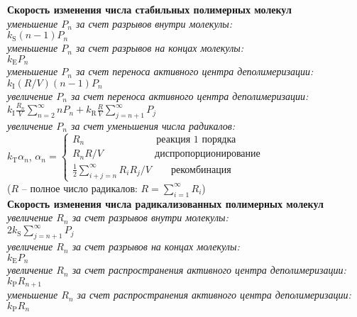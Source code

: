 \newpage
\begin{center}
	\textbf{Скорость изменения числа стабильных полимерных молекул} \\
	\textit{уменьшение $P_n$ за счет разрывов внутри молекулы:} \\
	$k_\mathrm{S} (n-1) P_n$ \\
	\textit{уменьшение $P_n$ за счет разрывов на концах молекулы:} \\
	$k_\mathrm{E} P_n$ \\
	\textit{уменьшение $P_n$ за счет переноса активного центра деполимеризации:} \\
	$k_\mathrm{I}(R / V)(n-1) P_n$ \\
	\textit{увеличение $P_n$ за счет переноса активного центра деполимеризации:} \\
	{$\displaystyle k_\mathrm{I} \frac{R_n}{V} \sum_{n=2}^{\infty} n P_n + k_{\mathrm{R}} \frac{R}{V} \sum_{j=n+1}^{\infty} P_j$} \\
	\textit{увеличение $P_n$ за счет уменьшения числа радикалов:} \\
	$k_\mathrm{T} \alpha_n$, $\alpha_n = \left\{
	\begin{array}{l}
		R_n \quad\quad\quad\quad\quad\quad\quad\: \text{реакция 1 порядка} \\
		R_n R / V \quad\quad\quad\quad\quad\: \text{диспропорционирование} \\
		{\displaystyle \frac{1}{2} \sum_{i+j=n}^{\infty} R_i R_j / V} \quad\quad \text{рекомбинация}
	\end{array}\right.$ \\
	($R$ -- полное число радикалов: {$\displaystyle R = \sum_{i=1}^{\infty} R_i$}) \\
	\textbf{Скорость изменения числа радикализованных полимерных молекул} \\
	\textit{увеличение $R_n$ за счет разрывов внутри молекулы:} \\
	$2 k_\mathrm{S} \sum_{j=n+1}^{\infty} P_j$ \\
	\textit{увеличение $R_n$ за счет разрывов на концах молекулы:} \\
	$k_\mathrm{E} P_n$ \\
	\textit{увеличение $R_n$ за счет распространения активного центра деполимеризации:} \\
	$k_\mathrm{P} R_{n+1}$ \\
	\textit{уменьшение $R_n$ за счет распространения активного центра деполимеризации:} \\
	$k_\mathrm{P} R_n$ \\

\end{center}
